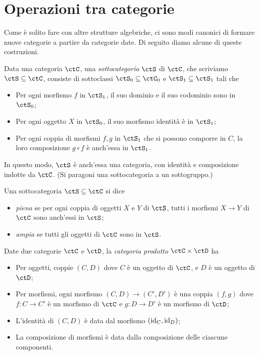 \section{Operazioni tra categorie}\label{sec_operazioni}

Come è solito fare con altre strutture algebriche, ci sono modi canonici di formare nuove categorie a partire da categorie date. 
Di seguito diamo alcune di queste costruzioni.

\begin{definition}\label{def_subcat}
	Data una categoria \(\ctC\), una \emph{sottocategoria} \(\ctS\) di \(\ctC\), che scriviamo \(\ctS\subseteq \ctC\), consiste di sottoclassi \(\ctS_0\subseteq\ctC_0\) e \(\ctS_1\subseteq\ctS_1\) tali che
	\begin{itemize}
		\item Per ogni morfismo \(f\) in \(\ctS_1\), il suo dominio e il suo codominio sono in \(\ctS_0\);
		\item Per ogni oggetto \(X\) in \(\ctS_0\), il suo morfismo identità è in \(\ctS_1\);
		\item Per ogni coppia di morfismi \(f,g\) in \(\ctS_1\) che si possono comporre in \(C\), la loro composizione \(g\circ f\) è anch'essa in \(\ctS_1\).
	\end{itemize}
	In questo modo, \(\ctS\) è anch'essa una categoria, con identità e composizione indotte da \(\ctC\). (Si paragoni una sottocategoria a un sottogruppo.)
	
	Una sottocategoria \(\ctS\subseteq \ctC\) si dice
	\begin{itemize}
		\item \emph{piena} se per ogni coppia di oggetti \(X\) e \(Y\) di \(\ctS\), tutti i morfismi \(X\to Y\) di \(\ctC\) sono anch'essi in \(\ctS\);
		\item \emph{ampia} se tutti gli oggetti di \(\ctC\) sono in \(\ctS\).
	\end{itemize}
\end{definition}

\begin{definition}\label{def_cat_prodotto}
	Date due categorie \(\ctC\) e \(\ctD\), la \emph{categoria prodotto} \(\ctC\times\ctD\) ha
	\begin{itemize}
		\item Per oggetti, coppie \((C,D)\) dove \(C\) è un oggetto di \(\ctC\), e \(D\) è un oggetto di \(\ctD\);
		\item Per morfismi, ogni morfismo \((C,D)\to(C',D')\) è una coppia \((f,g)\) dove \(f:C\to C'\) è un morfismo di \(\ctC\) e \(g:D\to D'\) è un morfismo di \(\ctD\);
		\item L'identità di \((C,D)\) è data dal morfismo \((\mathrm{id}_C,\mathrm{id}_D)\);
		\item La composizione di morfismi è data dalla composizione delle ciascune componenti.
	\end{itemize}
\end{definition}

